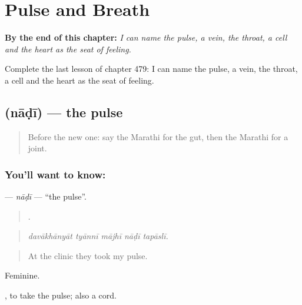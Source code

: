 
\chapter{Pulse and Breath}
\label{ch:mr-pulse-and-breath}

\begin{chapteropening}
\textbf{By the end of this chapter:} \emph{I can name the pulse, a vein, the throat, a cell and the heart as the seat of feeling.}

Complete the last lesson of chapter 479: I can name the pulse, a vein, the throat, a cell and the heart as the seat of feeling.
\end{chapteropening}

\section[\texorpdfstring{\mr{नाडी} (nāḍī)}{नाडी (nāḍī)}]{ (nāḍī) — the pulse}

\label{lesson:MR-C479-nadi}



\begin{quote}
Before the new one: say the Marathi for the gut, then the Marathi for a joint.
\end{quote}

\subsection*{You'll want to know: }
\textbf{} — \emph{nāḍī} — \textquotedblleft{}the pulse\textquotedblright{}.

\begin{quote}
    .
\end{quote}

\begin{quote}
\emph{davākhānyāt tyānnī mājhī nāḍī tapāslī.}
\end{quote}

\begin{quote}
At the clinic they took my pulse.
\end{quote}

Feminine.

 , to take the pulse; also a cord.

